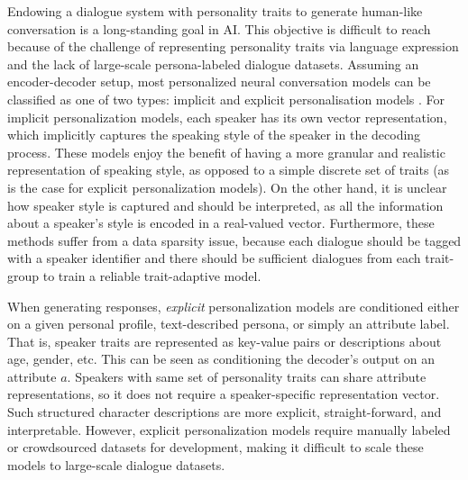 Endowing a dialogue system with personality traits to generate human-like conversation is a long-standing goal in AI. This objective is difficult to reach because of the challenge of representing personality traits via language expression and the lack of large-scale persona-labeled dialogue datasets. Assuming an encoder-decoder setup, most personalized neural conversation models can be classified as one of two types: implicit and explicit personalisation models \citep{zheng2019personalized}. For implicit personalization models, each speaker has its own vector representation, which implicitly captures the speaking style of the speaker in the decoding process. These models enjoy the benefit of having a more granular and realistic representation of speaking style, as opposed to a simple discrete set of traits (as is the case for explicit personalization models). On the other hand, it is unclear how speaker style is captured and should be interpreted, as all the information about a speaker's style is encoded in a real-valued vector. Furthermore, these methods suffer from a data sparsity issue, because each dialogue should be tagged with a speaker identifier and there should be sufficient dialogues from each trait-group to train a reliable trait-adaptive model. 

When generating responses, \textit{explicit} personalization models are conditioned either on a given personal profile, text-described persona, or simply an attribute label. That is, speaker traits are represented as key-value pairs or descriptions about age, gender, etc. This can be seen as conditioning the decoder's output on an attribute $a$. Speakers with same set of personality traits can share attribute representations, so it does not require a speaker-specific representation vector. Such structured character descriptions are more explicit, straight-forward, and interpretable. However, explicit personalization models require manually labeled or crowdsourced datasets for development, making it difficult to scale these models to large-scale dialogue datasets.


